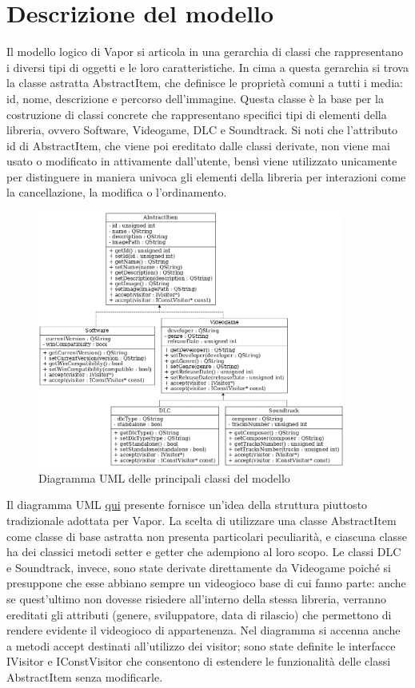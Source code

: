 \documentclass[10pt]{article}
\begin{document}
\section{Descrizione del modello}
Il modello logico di Vapor si articola in una gerarchia di classi che rappresentano i diversi tipi di oggetti e le loro caratteristiche. In cima a questa gerarchia si trova la classe astratta AbstractItem, che definisce le proprietà comuni a tutti i media: id, nome, descrizione e percorso dell'immagine. Questa classe è la base per la costruzione di classi concrete che rappresentano specifici tipi di elementi della libreria, ovvero Software, Videogame, DLC e Soundtrack. Si noti che l'attributo id di AbstractItem, che viene poi ereditato dalle classi derivate, non viene mai usato o modificato in attivamente dall'utente, bensì viene utilizzato unicamente per distinguere in maniera univoca gli elementi della libreria per interazioni come la cancellazione, la modifica o l'ordinamento.
\begin{figure} [h] \label{fig:uml}
    \centering
    \includegraphics[width=0.9\textwidth]{./uml_diagram.png}
    \caption{Diagramma UML delle principali classi del modello}
\end{figure}
Il diagramma UML \hyperref[fig:uml]{qui} presente fornisce un'idea della struttura piuttosto tradizionale adottata per Vapor.
La scelta di utilizzare una classe AbstractItem come classe di base astratta non presenta particolari peculiarità, e ciascuna classe ha dei classici metodi setter e getter che adempiono al loro scopo. Le classi DLC e Soundtrack, invece, sono state derivate direttamente da Videogame poiché si presuppone che esse abbiano sempre un videogioco base di cui fanno parte: anche se quest'ultimo non dovesse risiedere all'interno della stessa libreria, verranno ereditati gli attributi (genere, sviluppatore, data di rilascio) che permettono di rendere evidente il videogioco di appartenenza. Nel diagramma si accenna anche a metodi accept destinati all'utilizzo dei visitor; sono state definite le interfacce IVisitor e IConstVisitor che consentono di estendere le funzionalità delle classi AbstractItem senza modificarle.
\end{document}
